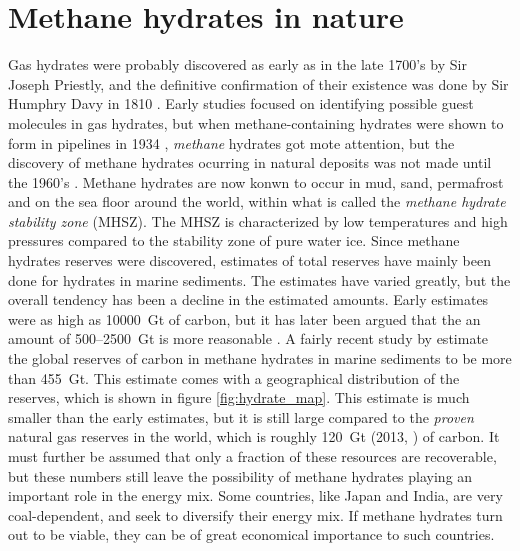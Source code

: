 \section{Methane hydrates in nature}
Gas hydrates were probably discovered as early as in the late 1700's by Sir Joseph Priestly, and the definitive confirmation of their existence was done by Sir Humphry Davy in 1810 \cite{Hester2009}. Early studies focused on identifying possible guest molecules in gas hydrates, but when methane-containing hydrates were shown to form in pipelines in 1934 \cite{Hammerschmidt1934}, \emph{methane} hydrates got mote attention, but the discovery of methane hydrates ocurring in natural deposits was not made until the 1960's \cite{Makogon200714}. Methane hydrates are now konwn to occur in mud, sand, permafrost and on the sea floor around the world, within what is called the \emph{methane hydrate stability zone} (MHSZ). The MHSZ is characterized by low temperatures and high pressures compared to the stability zone of pure water ice.  Since methane hydrates reserves were discovered, estimates of total reserves have mainly been done for hydrates in marine sediments. The estimates have varied greatly, but the overall tendency has been a decline in the estimated amounts. Early estimates were as high as \SI{10000}{\giga\tonne} of carbon, but it has later been argued that the an amount of 500–\SI{2500}{\giga\tonne} is more reasonable \cite{Milkov2004183}. A fairly recent study by \citet{Wallmann2012} estimate the global reserves of carbon in methane hydrates in marine sediments to be more than \SI{455}{\giga\tonne}. This estimate comes with a geographical distribution of the reserves, which is shown in figure \ref{fig:hydrate_map}. This estimate is much smaller than the early estimates, but it is still large compared to the \emph{proven} natural gas reserves in the world, which is roughly \SI{120}{\giga\tonne} (2013, \cite{CIA2013}) of carbon. It must further be assumed that only a fraction of these resources are recoverable, but these numbers still leave the possibility of methane hydrates playing an important role in the energy mix. Some countries, like Japan and India, are very coal-dependent, and seek to diversify their energy mix. If methane hydrates turn out to be viable, they can be of great economical importance to such countries. 
